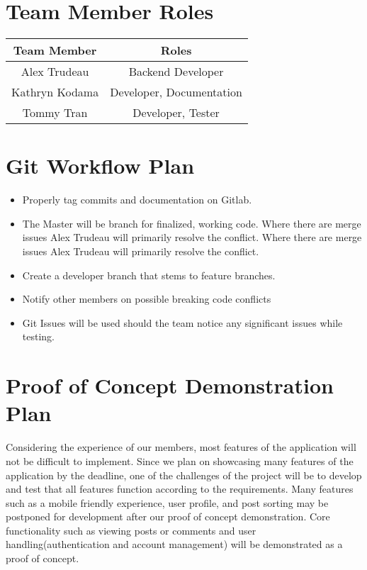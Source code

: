 \documentclass[12pt,fleqn]{article}
\begin{document}
\section {Team Member Roles}
\begin{tabular}{ | c | c | }
\hline 
\textbf{Team Member} & \textbf{Roles} \\
\hline
Alex Trudeau & Backend Developer \\
\hline 
Kathryn Kodama & Developer, Documentation \\
\hline
Tommy Tran & Developer, Tester \\
\hline

\end{tabular}

\section {Git Workflow Plan}
\begin{itemize}
\item Properly tag commits and documentation on Gitlab.
\item The Master will be branch for finalized, working code.  Where there are merge issues Alex Trudeau will primarily resolve the conflict.  Where there are merge issues Alex Trudeau will primarily resolve the conflict.
\item Create a developer branch that stems to feature branches.
\item Notify other members on possible breaking code conflicts
\item Git Issues will be used should the team notice any significant issues while testing. 
\end{itemize}

\section {Proof of Concept Demonstration Plan}
Considering the experience of our members, most features of the application will not be difficult to implement. Since we plan on showcasing many features of the application by the deadline, one of the challenges of the project will be to develop and test that all features function according to the requirements. Many features such as a mobile friendly experience, user profile, and post sorting may be postponed for development after our proof of concept demonstration. Core functionality such as viewing posts or comments and user handling(authentication and account management) will be demonstrated as a proof of concept.
\end{document}
